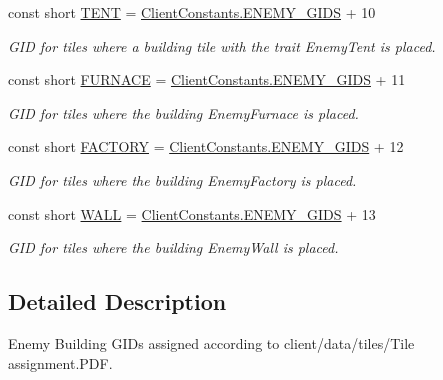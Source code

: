\begin{DoxyCompactItemize}
const short \hyperlink{classClient_1_1Common_1_1Constants_1_1EnemyBuildingGid_a296e67edf8d5e701bce6602512f1eb82}{T\+E\+N\+T} = \hyperlink{classClient_1_1Common_1_1Constants_1_1ClientConstants_a0f927a203a7e65984b85f98eed560cb7}{Client\+Constants.\+E\+N\+E\+M\+Y\+\_\+\+G\+I\+D\+S} + 10
\begin{DoxyCompactList}\small\item\em G\+I\+D for tiles where a building tile with the trait Enemy\+Tent is placed. \end{DoxyCompactList}\item 
const short \hyperlink{classClient_1_1Common_1_1Constants_1_1EnemyBuildingGid_a9ec841522b56d5834bbd691c3e66c97e}{F\+U\+R\+N\+A\+C\+E} = \hyperlink{classClient_1_1Common_1_1Constants_1_1ClientConstants_a0f927a203a7e65984b85f98eed560cb7}{Client\+Constants.\+E\+N\+E\+M\+Y\+\_\+\+G\+I\+D\+S} + 11
\begin{DoxyCompactList}\small\item\em G\+I\+D for tiles where the building Enemy\+Furnace is placed. \end{DoxyCompactList}\item 
const short \hyperlink{classClient_1_1Common_1_1Constants_1_1EnemyBuildingGid_a6d64be47e559a2dfecac293b12d0becf}{F\+A\+C\+T\+O\+R\+Y} = \hyperlink{classClient_1_1Common_1_1Constants_1_1ClientConstants_a0f927a203a7e65984b85f98eed560cb7}{Client\+Constants.\+E\+N\+E\+M\+Y\+\_\+\+G\+I\+D\+S} + 12
\begin{DoxyCompactList}\small\item\em G\+I\+D for tiles where the building Enemy\+Factory is placed. \end{DoxyCompactList}\item 
const short \hyperlink{classClient_1_1Common_1_1Constants_1_1EnemyBuildingGid_ab95251d60796e038a761b446ac3fb76f}{W\+A\+L\+L} = \hyperlink{classClient_1_1Common_1_1Constants_1_1ClientConstants_a0f927a203a7e65984b85f98eed560cb7}{Client\+Constants.\+E\+N\+E\+M\+Y\+\_\+\+G\+I\+D\+S} + 13
\begin{DoxyCompactList}\small\item\em G\+I\+D for tiles where the building Enemy\+Wall is placed. \end{DoxyCompactList}\end{DoxyCompactItemize}


\subsection{Detailed Description}
Enemy Building G\+I\+Ds assigned according to \textquotesingle{}client/data/tiles/\+Tile assignment.\+P\+D\+F\textquotesingle{}. 




